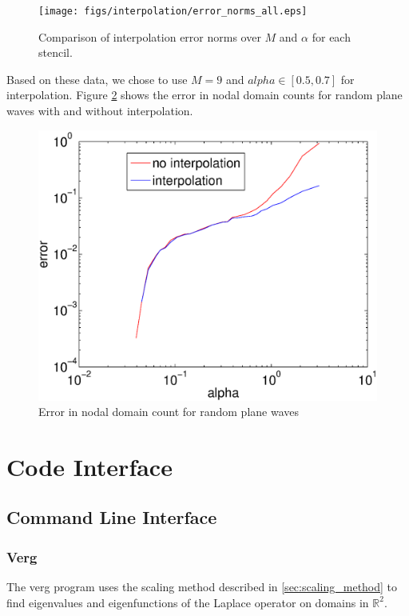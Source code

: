 \documentclass{report}
\begin{document}
\begin{figure}
  \begin{center}
    \texttt{[image: figs/interpolation/error\_norms\_all.eps]}
    \caption{Comparison of interpolation error norms over $M$ and $\alpha$ for each stencil.}
    \label{fig:errors_all}
  \end{center}
\end{figure}

Based on these data, we chose to use $M=9$ and $alpha \in [0.5, 0.7]$ for interpolation. Figure \ref{fig:rpw_count_errors} shows the error in nodal domain counts for random plane waves with and without interpolation.

\begin{figure}
  \begin{center}
    \includegraphics[width=\textwidth]{figs/interpolation/rpw_errors.eps}
    \caption{Error in nodal domain count for random plane waves}
    \label{fig:rpw_count_errors}
  \end{center}
\end{figure}


\chapter{Code Interface}
\label{sec:api}
\section{Command Line Interface}
\subsection{Verg}
The verg program uses the scaling method described in \ref{sec:scaling_method} to find eigenvalues and eigenfunctions of the Laplace operator on domains in $\mathbb{R}^{2}$.
\end{document}
